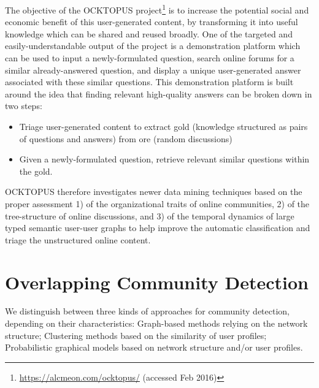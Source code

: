 The objective of the OCKTOPUS project\footnote{\url{https://alcmeon.com/ocktopus/} (accessed Feb 2016)} is to increase the potential social and economic benefit of this user-generated content, by transforming it into useful knowledge which can be shared and reused broadly. 
One of the targeted and easily-understandable output of the project is a demonstration platform which can be used to input a newly-formulated question, search online forums for a similar already-answered question, and display a unique user-generated answer associated with these similar questions.
This demonstration platform is built around the idea that finding relevant high-quality answers can be broken down in two steps:
\begin{itemize}
\item{Triage user-generated content to extract gold (knowledge structured as pairs of questions and answers) from ore (random discussions)}
\item{Given a newly-formulated question, retrieve relevant similar questions within the gold.}
\end{itemize}
OCKTOPUS therefore investigates newer data mining techniques based on the proper assessment 1) of the organizational traits of online communities, 2) of the tree-structure of online discussions, and 3) of the temporal dynamics of large typed semantic user-user graphs to help improve the automatic classification and triage the unstructured online content.



\section{Overlapping Community Detection}
We distinguish between three kinds of approaches for community detection, depending on their characteristics: Graph-based methods relying on the network structure; Clustering methods based on the similarity of user profiles; Probabilistic graphical models based on network structure and/or user profiles.

